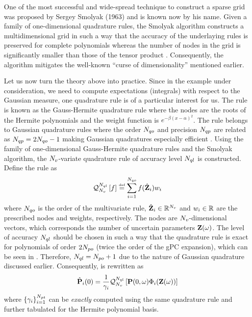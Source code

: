 One of the most successful and wide-spread technique to construct a sparse grid was proposed by Sergey Smolyak (1963) and is known now by his name. Given a family of one-dimensional quadrature rules, the Smolyak algorithm constructs a multidimensional grid in such a way that the accuracy of the underlaying rules is preserved for complete polynomials whereas the number of nodes in the grid is significantly smaller than those of the tensor product \cite{heiss2008, burkardt2011}. Consequently, the algorithm mitigates the well-known ``curse of dimensionality'' mentioned earlier.

Let us now turn the theory above into practice. Since in the example under consideration, we need to compute expectations (integrals) with respect to the Gaussian measure, one quadrature rule is of a particular interest for us. The rule is known as the Gauss-Hermite quadrature rule where the nodes are the roots of the Hermite polynomials and the weight function is $e^{-\beta (x - \alpha)^2}$. The rule belongs to Gaussian quadrature rules where the order $N_{qo}$ and precision $N_{qp}$ are related as $N_{qp} = 2 N_{qo} - 1$ making Gaussian quadratures especially efficient \cite{heiss2008}. Using the family of one-dimensional Gauss-Hermite quadrature rules and the Smolyak algorithm, the ${N_v}$-variate quadrature rule of accuracy level $N_{ql}$ is constructed. Define the rule as
\[
  \mathcal{Q}_{{N_v}}^{N_{ql}}\left[f\right] \stackrel{\text{\tiny def}}{=} \sum_{i = 1}^{N_{qo}} f(\hat{\mathbf{Z}}_i) w_i
\]
where $N_{qo}$ is the order of the multivariate rule, $\hat{\mathbf{Z}}_i \in \mathbb{R}^{N_v}$ and $w_i \in \mathbb{R}$ are the prescribed nodes and weights, respectively. The nodes are ${N_v}$-dimensional vectors, which corresponds the number of uncertain parameters $\mathbf{Z}(\omega)$. The level of accuracy $N_{ql}$ should be chosen in such a way that the quadrature rule is exact for polynomials of order $2 {N_{po}}$ (twice the order of the gPC expansion), which can be seen in . Therefore, $N_{ql} = {N_{po}} + 1$ due to the nature of Gaussian quadrature discussed earlier. Consequently,  is rewritten as
\[
  \hat{\mathbf{P}}_i(0) = \frac{1}{\gamma_i} \mathcal{Q}_{{N_v}}^{N_{ql}}\left[\mathbf{P}(0, \omega) \Phi_i(\mathbf{Z}(\omega))\right]
\]
where $\{ \gamma_i \}_{i = 1}^{{N_{pt}}}$ can be \emph{exactly} computed using the same quadrature rule and further tabulated for the Hermite polynomial basis.
